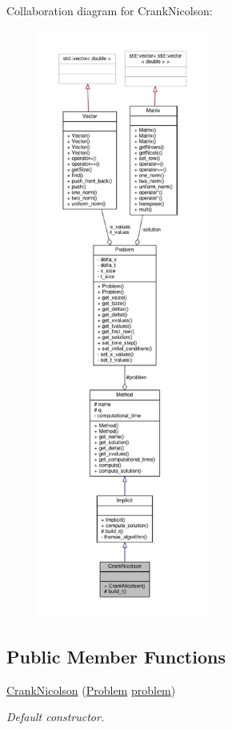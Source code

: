 Collaboration diagram for Crank\+Nicolson\+:
\nopagebreak
\begin{figure}[H]
\begin{center}
\leavevmode
\includegraphics[height=550pt]{classCrankNicolson__coll__graph}
\end{center}
\end{figure}
\subsection*{Public Member Functions}
\begin{DoxyCompactItemize}
\item 
\hyperlink{classCrankNicolson_a57f6bedf8527a32e39a2384ef448e417}{Crank\+Nicolson} (\hyperlink{classProblem}{Problem} \hyperlink{classMethod_a29a08a679b5d30a8c813766308205041}{problem})
\begin{DoxyCompactList}\small\item\em Default constructor. \end{DoxyCompactList}\end{DoxyCompactItemize}
